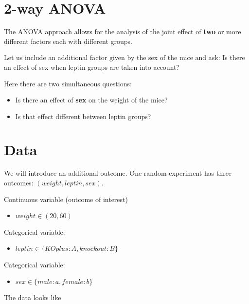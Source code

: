 \documentclass[
]{book}
\providecommand{\tightlist}{%
  \setlength{\itemsep}{0pt}\setlength{\parskip}{0pt}}
\begin{document}
\hypertarget{way-anova}{%
\section{2-way ANOVA}\label{way-anova}}

The ANOVA approach allows for the analysis of the joint effect of \textbf{two} or more different factors each with different groups.

Let us include an additional factor given by the sex of the mice and ask: Is there an effect of sex when leptin groups are taken into account?

Here there are two simultaneous questions:

\begin{itemize}
\item
  Is there an effect of \textbf{sex} on the weight of the mice?
\item
  Is that effect different between leptin groups?
\end{itemize}

\hypertarget{data-4}{%
\section{Data}\label{data-4}}

We will introduce an additional outcome. One random experiment has three outcomes: \((weight, leptin, sex)\).

Continuous variable (outcome of interest)

\begin{itemize}
\tightlist
\item
  \(weight \in (20, 60)\)
\end{itemize}

Categorical variable:

\begin{itemize}
\tightlist
\item
  \(leptin \in \{KOplus:A,knockout:B\}\)
\end{itemize}

Categorical variable:

\begin{itemize}
\tightlist
\item
  \(sex \in \{male:a,female:b\}\)
\end{itemize}

The data looks like
\end{document}
